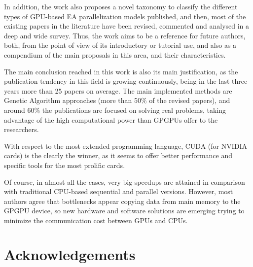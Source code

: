 \documentclass{article}
\begin{document}
In addition, the work also proposes a novel taxonomy to classify the different types of GPU-based EA parallelization models published, and then, most of the existing papers in the literature have been revised, commented and analysed in a deep and wide survey.
Thus, the work aims to be a reference for future authors, both, from the point of view of its introductory or tutorial use, and also as a compendium of the main proposals in this area, and their characteristics.

The main conclusion reached in this work is also its main justification, as the publication tendency in this field is growing continuously, being in the last three years more than 25 papers on average. The main implemented methods are Genetic Algorithm approaches (more than 50\% of the revised papers), and around 60\% the publications are focused on solving real problems, taking advantage of the high computational power than GPGPUs offer to the researchers.

With respect to the most extended programming language, CUDA (for NVIDIA cards) is the clearly the winner, as it seems to offer better performance and specific tools for the most prolific cards.

Of course, in almost all the cases, very big speedups are attained in comparison with traditional CPU-based sequential and parallel versions. However, most authors agree that bottlenecks appear copying data from main memory to the GPGPU device, so new hardware and software solutions are emerging trying to minimize
the communication cost between GPUs and CPUs.




\section*{Acknowledgements}
\end{document}
